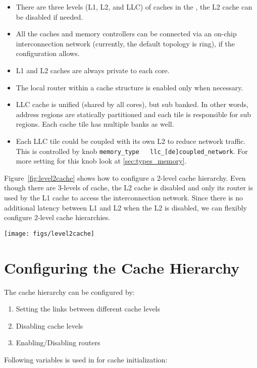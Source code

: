 \begin{itemize} 
  \item There are three levels (L1, L2, and LLC) of caches in the
	\SIM , the L2 cache can be disabled if needed.

  \item All the caches and memory controllers can be connected via an
    on-chip interconnection network (currently, the default topology
    is ring), if the configuration allows.

  \item L1 and L2 caches are always private to each core.

  \item The local router within a cache structure is enabled only when
	necessary.

  \item LLC cache is unified (shared by all cores), but sub banked. In
    other words, address regions are statically partitioned and each
    tile is responsible for sub regions. Each cache tile has multiple
    banks as well.
   
  \item Each LLC tile could be coupled with its own L2 to reduce network
	  traffic. This is controlled by knob \Verb+memory_type   llc_[de]coupled_network+.
	  For more setting for this knob look at \ref{sec:types_memory}.

\end{itemize}


Figure~\ref{fig:level2cache} shows how to configure a 2-level cache hierarchy.
Even though there are 3-levels of cache, the L2 cache is disabled and only its
router is used by the L1 cache to access the interconnection network. Since
there is no additional latency between L1 and L2 when the L2 is disabled, we
can flexibly configure 2-level cache hierarchies.


\begin{figure*}[htb]
\centering
\texttt{[image: figs/level2cache]}
\caption{2-Level cache hierarchy.}
\label{fig:level2cache}
\end{figure*}

\section{Configuring the Cache Hierarchy} 

The cache hierarchy can be configured by:
\begin{enumerate}
 \item Setting the links between different cache levels
 \item Disabling cache levels
 \item Enabling/Disabling routers
\end{enumerate}
Following variables is used in \SIM for cache initialization:

